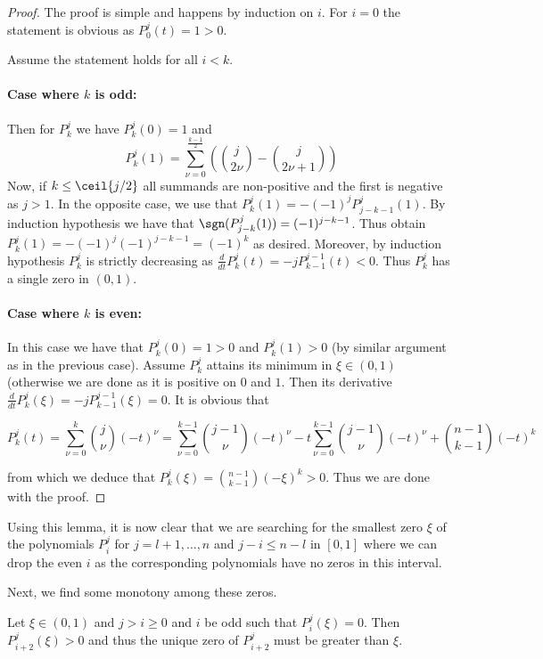 \begin{proof}
  The proof is simple and happens by induction on $i$. For $i=0$ the statement is obvious as $P_0^j(t)=1>0$.

  Assume the statement holds for all $i<k$. 
  \paragraph{Case where $k$ is odd:}
  Then for $P_k^j$ we have $P_k^j(0)=1$ and
  $$
    P_k^j(1)=\sum_{\nu=0}^{\frac{k-1}{2}}{\left(\binom{j}{2\nu}-\binom{j}{2\nu+1}\right)}
  $$
  Now, if $k\leq \ceil{j/2}$ all summands are non-positive and the first is negative as $j>1$. In the opposite case, we use that $P_k^j(1)=-(-1)^jP_{j-k-1}^j(1)$. By induction hypothesis we have that $\sgn(P_{j-k}^j(1))=(-1)^{j-k-1}$. Thus obtain $P_k^j(1)=-(-1)^j(-1)^{j-k-1}=(-1)^k$ as desired. Moreover, by induction hypothesis $P_k^j$ is strictly decreasing as $\frac{d}{d t}P_k^j(t)=-jP_{k-1}^{j-1}(t)<0$. Thus $P_k^j$ has a single zero in $(0,1)$.
  
  \paragraph{Case where $k$ is even:} In this case we have that $P_k^j(0)=1>0$ and $P_k^j(1)>0$ (by similar argument as in the previous case). Assume $P_k^j$ attains its minimum in $\xi\in(0,1)$ (otherwise we are done as it is positive on $0$ and $1$. Then its derivative $\frac{d}{d t}P_k^j(\xi)=-jP_{k-1}^{j-1}(\xi)=0$. It is obvious that

  $$
    P_k^j(t)=\sum_{\nu=0}^k{\binom{j}{\nu}(-t)^\nu}=\sum_{\nu=0}^{k-1}{\binom{j-1}{\nu}(-t)^\nu}-t\sum_{\nu=0}^{k-1}{\binom{j-1}{\nu}(-t)^\nu}+\binom{n-1}{k-1}(-t)^k
  $$

  from which we deduce that $P_k^j(\xi)=\binom{n-1}{k-1}(-\xi)^k>0$. Thus we are done with the proof.
\end{proof}

Using this lemma, it is now clear that we are searching for the smallest zero $\xi$ of the polynomials $P_i^j$ for $j=l+1,\ldots,n$ and $j-i\leq n-l$ in $[0,1]$ where we can drop the even $i$ as the corresponding polynomials have no zeros in this interval. 

Next, we find some monotony among these zeros.

\begin{lemma}
  Let $\xi\in(0,1)$ and $j>i\geq 0$ and $i$ be odd such that $P_i^j(\xi)=0$. Then $P_{i+2}^j(\xi)>0$ and thus the unique zero of $P_{i+2}^j$ must be greater than $\xi$.
\end{lemma}

